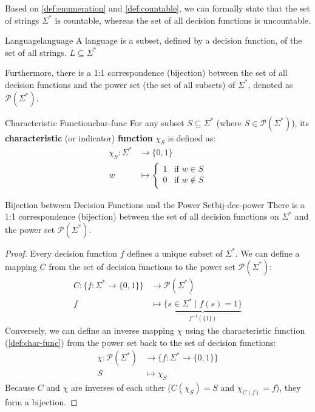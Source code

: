 \noindent Based on \cref{def:enumeration} and \cref{def:countable}, we can formally state that the set of strings \(\Sigma^*\) is countable, whereas the set of all decision functions is uncountable.

\begin{definition}{Language}{language}
    A language is a subset, defined by a decision function, of the set of all strings. \(L\subseteq\Sigma^*\) 
\end{definition}
\noindent Furthermore, there is a 1:1 correspondence (bijection) between the set of all decision functions and the power set (the set of all subsets) of \(\Sigma^*\), denoted as \(\mathcal{P}(\Sigma^*)\). 

\begin{definition}{Characteristic Function}{char-func}
    For any subset \(S \subseteq \Sigma^*\) (where \(S \in \mathcal{P}(\Sigma^*)\)), its \textbf{characteristic} (or indicator) \textbf{function} \(\chi_S\) is defined as:
    \[
    \begin{aligned}
        \chi_{S}: \Sigma^* &\rightarrow \{0,1\}\\
        w &\mapsto \begin{cases}
            1 & \text{if } w \in S\\
            0 & \text{if } w \notin S
        \end{cases}
    \end{aligned}
    \]
\end{definition}

\begin{theorem}{Bijection between Decision Functions and the Power Set}{bij-dec-power}
    There is a 1:1 correspondence (bijection) between the set of all decision functions on \(\Sigma^*\) and the power set \(\mathcal{P}(\Sigma^*)\).
    \begin{proof}
        Every decision function \(f\) defines a unique subset of \(\Sigma^*\). We can define a mapping \(C\) from the set of decision functions to the power set \(\mathcal{P}(\Sigma^*)\):
        \[
        \begin{aligned}
            C: \{f : \Sigma^* \rightarrow \{0,1\}\} &\rightarrow \mathcal{P}(\Sigma^*)\\
            f &\mapsto \underbrace{\{s \in \Sigma^* \mid f(s) = 1\}}_{f^{-1}(\{1\})}
        \end{aligned}
        \]
        Conversely, we can define an inverse mapping \(\chi\) using the characteristic function (\cref{def:char-func}) from the power set back to the set of decision functions:
        \[
        \begin{aligned}
            \chi: \mathcal{P}(\Sigma^*) &\rightarrow \{f : \Sigma^* \rightarrow \{0,1\}\}\\
            S &\mapsto \chi_S
        \end{aligned}
        \]
        Because \(C\) and \(\chi\) are inverses of each other (\(C(\chi_S) = S\) and \(\chi_{C(f)} = f\)), they form a bijection. 
    \end{proof}
\end{theorem}

